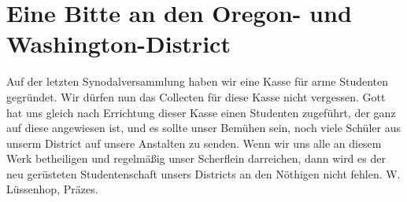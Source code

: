 \chapter{Eine Bitte an den Oregon- und Washington-District}

Auf der letzten Synodalversammlung haben wir eine Kasse für arme Studenten gegründet. Wir dürfen nun das Collecten für diese Kasse nicht vergessen. Gott hat uns gleich nach Errichtung dieser Kasse einen Studenten zugeführt, der ganz auf diese angewiesen ist, und es sollte unser Bemühen sein, noch viele Schüler aus unserm District auf unsere Anstalten zu senden. Wenn wir uns alle an diesem Werk betheiligen und regelmäßig unser Scherflein darreichen, dann wird es der neu gerüsteten Studentenschaft unsers Districts an den Nöthigen nicht fehlen. W. Lüssenhop, Präzes.
